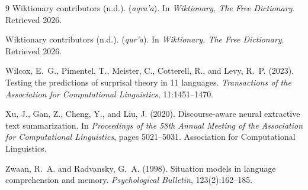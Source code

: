 \documentclass[11pt]{article}
\begin{document}
\begin{thebibliography}{9}
Wiktionary contributors (n.d.).
 (\emph{aqra'a}).
\newblock In \emph{Wiktionary, The Free Dictionary}. Retrieved 2026.

Wiktionary contributors (n.d.).
 (\emph{qur'a}).
\newblock In \emph{Wiktionary, The Free Dictionary}. Retrieved 2026.

Wilcox, E.~G., Pimentel, T., Meister, C., Cotterell, R., and Levy, R.~P. (2023).
\newblock Testing the predictions of surprisal theory in 11 languages.
\newblock \emph{Transactions of the Association for Computational Linguistics}, 11:1451--1470.

Xu, J., Gan, Z., Cheng, Y., and Liu, J. (2020).
\newblock Discourse-aware neural extractive text summarization.
\newblock In \emph{Proceedings of the 58th Annual Meeting of the Association for Computational Linguistics}, pages 5021--5031. Association for Computational Linguistics.

Zwaan, R.~A. and Radvansky, G.~A. (1998).
\newblock Situation models in language comprehension and memory.
\newblock \emph{Psychological Bulletin}, 123(2):162--185.

\end{thebibliography}
\end{document}
